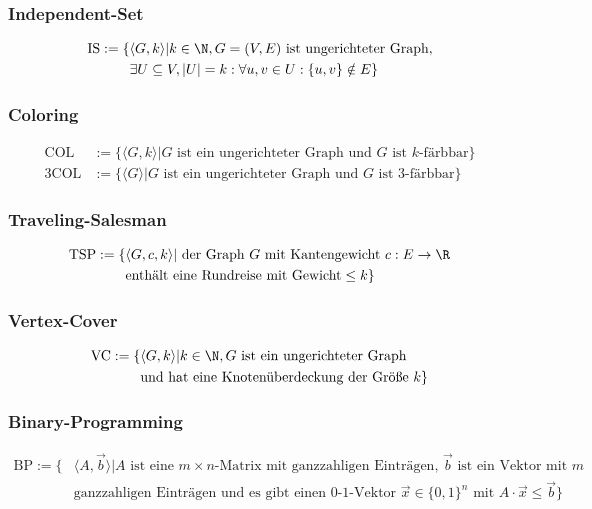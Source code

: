 \documentclass{article}
\begin{document}
\subsubsection{Independent-Set}
\begin{align*}
	\text{IS}:=\{&\langle G, k \rangle|k\in \N, G = (V,E) \text{ ist ungerichteter Graph}, \\
	&\exists U\subseteq V, |U|=k:\forall u, v\in U:\{u, v\}\notin E\}
\end{align*}
\subsubsection{Coloring}
\begin{align*}
	\text{COL}&:=\{\langle G, k\rangle|G \text{ ist ein ungerichteter Graph und } G \text{ ist } k\text{-färbbar}\} \\
	\text{3COL}&:=\{\langle G \rangle|G \text{ ist ein ungerichteter Graph und } G \text{ ist 3-färbbar}\}
\end{align*}
\subsubsection{Traveling-Salesman}
\begin{align*}
	\text{TSP}:=\{&\langle G, c, k\rangle|\text{ der Graph } G \text{ mit Kantengewicht } c:E\to\R \\
		& \text{enthält eine Rundreise mit Gewicht} \leq k\}
\end{align*}
\subsubsection{Vertex-Cover}
\begin{align*}
	\text{VC}:=\{&\langle G, k\rangle|k\in\N, G \text{ ist ein ungerichteter Graph} \\
	&\text{und hat eine Knotenüberdeckung der Größe } k\}
\end{align*}
\subsubsection{Binary-Programming}
\begin{align*}
	\text{BP}:=\{&\langle A, \vec{b}\rangle|A \text{ ist eine } m\times n \text{-Matrix mit ganzzahligen Einträgen, }\vec{b} \text{ ist ein Vektor mit } m \\
	&\text{ganzzahligen Einträgen und es gibt einen 0-1-Vektor } \vec{x}\in\{0,1\}^n \text{ mit } A\cdot\vec{x}\leq\vec{b}\}
\end{align*}
\end{document}
